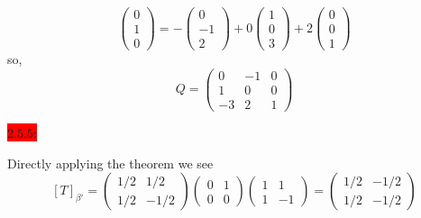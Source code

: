 \documentclass{exam}
\begin{document}
\begin{solution}
\[\begin{pmatrix}
          0 \\ 1 \\ 0
        \end{pmatrix}
        = - \begin{pmatrix}
          0 \\ -1 \\ 2
        \end{pmatrix}
        + 0\begin{pmatrix}
          1 \\ 0 \\ 3
        \end{pmatrix}
        + 2 \begin{pmatrix}
          0 \\ 0 \\ 1
        \end{pmatrix}
    \]
    so, 
    \[
      \boxed{
        Q = \begin{pmatrix}
          0 & -1 & 0 \\
          1 & 0 & 0 \\
          -3 & 2 & 1
        \end{pmatrix}
      }
    \]
  \end{solution}

  \colorbox{red}{\underline{$2.5.5$}:}
  \begin{solution}
    Directly applying the theorem we see 
    \[
      [T]_{\beta'} = \begin{pmatrix}
        1/2 & 1/2 \\
        1/2 & -1/2
      \end{pmatrix}
      \begin{pmatrix}
        0 & 1 \\
        0 & 0
      \end{pmatrix}
      \begin{pmatrix}
        1 & 1 \\
        1 & -1 
      \end{pmatrix}
      = \boxed{
        \begin{pmatrix}
          1/2 & -1/2 \\
          1/2 & -1/2
        \end{pmatrix}
      }
    \]
  \end{solution}
\end{document}

